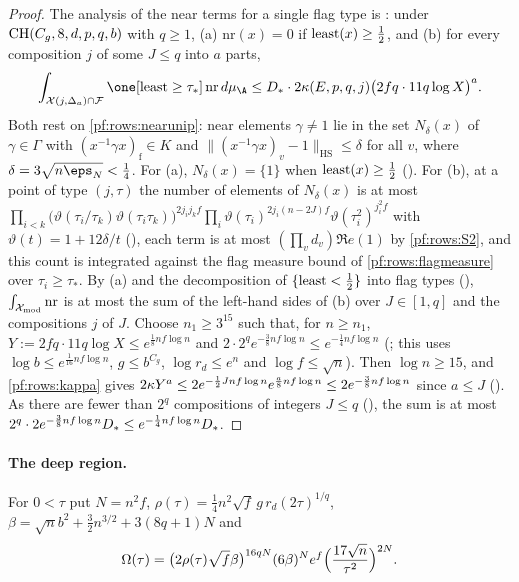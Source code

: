 \begin{proof}
The analysis of the near terms for a single flag type is
: under $\mathrm{CH}(C_g,8,d,p,q,b)$ with
$q\ge1$, (a) $\mathrm{nr}(x)=0$ if $\operatorname{least}(x)\ge\frac12$, and (b) for every composition $j$ of some $J\le q$ into $a$
parts,
\[
\int_{\mathcal X(j,\Delta_a)\cap\mathcal F}\one[\rowsleast\ge\tau_*]\,\mathrm{nr}\,d\mu_{\A}\le
\rowsDst\cdot2\rowskap(E,p,q,j)\bigl(2fq\cdot11q\log X\bigr)^a .
\]
Both rest on \cref{pf:rows:nearunip}: near elements $\gamma\ne1$ lie in the set $N_\delta(x)$ of $\gamma\in\Gamma$ with
$(x^{-1}\gamma x)_{\mathrm f}\in K$ and $\|(x^{-1}\gamma x)_v-1\|_{\mathrm{HS}}\le\delta$ for all $v$, where $\delta=3\sqrt{n\eps_N}<\frac14$.
For (a), $N_\delta(x)=\{1\}$ when $\operatorname{least}(x)\ge\frac12$ (). For (b), at a
point of type $(j,\tau)$ the number of elements of $N_\delta(x)$ is at most
$\prod_{i<k}\bigl(\vartheta(\tau_i/\tau_k)\vartheta(\tau_i\tau_k)\bigr)^{2j_ij_kf}\prod_i\vartheta(\tau_i)^{2j_i(n-2J)f}\vartheta(\tau_i^2)^{j_i^2f}$
with $\vartheta(t)=1+12\delta/t$ (), each term is at most $(\prod_vd_v)\Re e(1)$ by
\ref{pf:rows:S2}, and this count is integrated against the flag measure bound of \cref{pf:rows:flagmeasure} over
$\tau_i\ge\tau_*$.
By (a) and the decomposition of $\{\operatorname{least}<\frac12\}$ into flag types
(), $\int_{\mathcal{X}_{\mathrm{mod}}}\mathrm{nr}$ is at most the sum of the
left-hand sides of (b) over $J\in[1,q]$ and the compositions $j$ of $J$. Choose $n_1\ge3^{15}$ such that, for $n\ge n_1$,
$Y:=2fq\cdot11q\log X\le e^{\frac18nf\log n}$ and $2\cdot2^qe^{-\frac38nf\log n}\le e^{-\frac14nf\log n}$
(; this uses $\log b\le e^{\frac1{16}nf\log n}$, $g\le b^{C_g}$,
$\log r_d\le e^n$ and $\log f\le\sqrt n$). Then $\log n\ge15$, and \cref{pf:rows:kappa} gives
$2\kappa Y^a\le2e^{-\frac12Jnf\log n}e^{\frac a8nf\log n}\le2e^{-\frac38nf\log n}$ since $a\le J$
(). As there are fewer than $2^q$ compositions of integers $J\le q$
(), the sum is at most $2^q\cdot2e^{-\frac38nf\log n}D_*\le
e^{-\frac14nf\log n}D_*$.
\end{proof}

\paragraph{The deep region.}
For $0<\tau$ put $N=n^2f$, $\rho(\tau)=\frac14n^2\sqrt f\,g\,r_d(2\tau)^{1/q}$, $\beta=\sqrt nb^2+\frac32n^{3/2}+3(8q+1)N$ and
\[
\Omega(\tau)=\bigl(2\rho(\tau)\sqrt f\beta\bigr)^{16qN}(6\beta)^Ne^f\Bigl(\frac{17\sqrt n}{\tau^2}\Bigr)^{2N}.
\]

